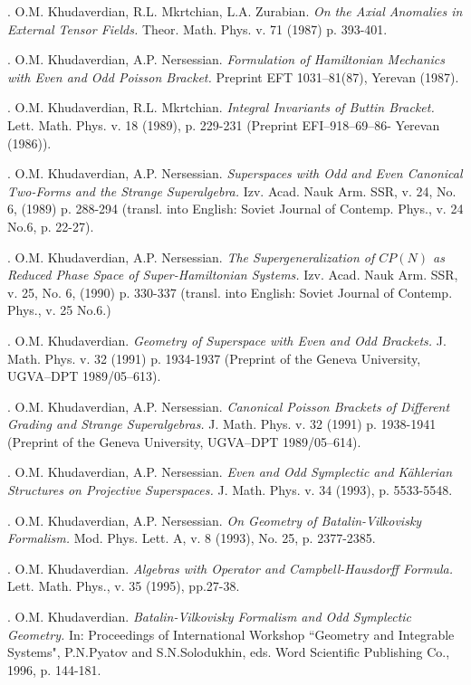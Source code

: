 \documentclass[12pt]{article}
\begin{document}
. O.M. Khudaverdian, R.L. Mkrtchian, L.A. Zurabian.
{\it On the Axial Anomalies
    in External Tensor Fields.}
 Theor. Math. Phys. v. 71 (1987) p. 393-401.

. O.M. Khudaverdian, A.P. Nersessian.
{\it Formulation of Hamiltonian Mechanics
          with Even and Odd Poisson Bracket.}
 Preprint EFT 1031--81(87), Yerevan (1987).

. O.M. Khudaverdian, R.L. Mkrtchian.
 {\it Integral Invariants of Buttin Bracket.}
              Lett. Math. Phys. v. 18 (1989),  p. 229-231
    (Preprint  EFI--918--69--86- Yerevan (1986)).

. O.M. Khudaverdian, A.P. Nersessian.
{\it Superspaces with Odd and Even
   Canonical Two-Forms and the Strange Superalgebra.}
 Izv. Acad. Nauk Arm. SSR,
   v. 24, No. 6, (1989) p. 288-294 (transl. into English: Soviet Journal
   of Contemp. Phys., v. 24 No.6, p. 22-27).

. O.M. Khudaverdian, A.P. Nersessian.
{\it The Supergeneralization of $CP(N)$ as Reduced Phase Space
  of Super-Hamiltonian Systems.}
 Izv. Acad. Nauk Arm. SSR,
 v. 25, No. 6, (1990) p. 330-337  (transl. into English: Soviet Journal
   of Contemp. Phys., v. 25 No.6.)

. O.M. Khudaverdian.
{\it Geometry of Superspace with Even and Odd Brackets.}
    J. Math. Phys. v. 32 (1991) p. 1934-1937
  (Preprint of the Geneva University, UGVA--DPT 1989/05--613).

. O.M. Khudaverdian, A.P. Nersessian.
{\it Canonical Poisson Brackets of Different
     Grading and Strange Superalgebras.}
 J. Math. Phys. v. 32 (1991) p. 1938-1941
  (Preprint of the Geneva University, UGVA--DPT 1989/05--614).

. O.M. Khudaverdian, A.P. Nersessian.
  {\it Even and Odd Symplectic and  K\"ahlerian
  Structures on Projective Superspaces.}
 J. Math. Phys. v. 34 (1993), p. 5533-5548.

. O.M. Khudaverdian, A.P. Nersessian.
 {\it On Geometry of Batalin-Vilkovisky
   Formalism.}  Mod. Phys. Lett. A, v. 8 (1993), No. 25, p. 2377-2385.

. O.M. Khudaverdian.
{\it Algebras with Operator and Campbell-Hausdorff Formula.}
    Lett. Math. Phys., v. 35 (1995), pp.27-38.

. O.M. Khudaverdian.
 {\it Batalin-Vilkovisky Formalism and Odd Symplectic
 Geometry.}
 In: Proceedings of International Workshop
 ``Geometry and Integrable Systems",
 P.N.Pyatov and S.N.Solodukhin, eds.
 Word Scientific Publishing Co., 1996, p. 144-181.
\end{document}
